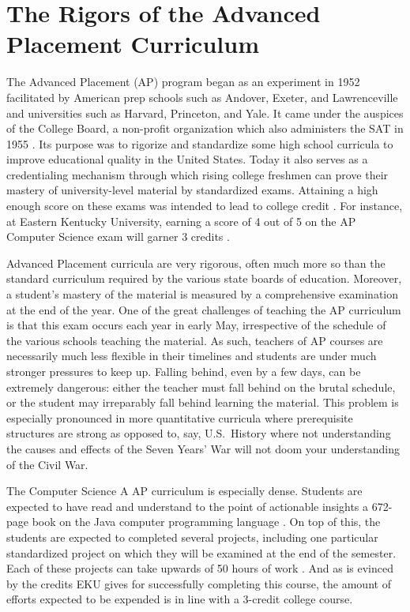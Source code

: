 
\section{The Rigors of the Advanced Placement Curriculum}\label{sec:ap}

The Advanced Placement (AP) program began as an experiment in 1952 facilitated
by American prep schools such as Andover, Exeter, and Lawrenceville and
universities such as Harvard, Princeton, and Yale. It came under the auspices of
the College Board, a non-profit organization which also administers the SAT
\autocite[``How is the SAT related to the College Board'']{SATFAQ} in 1955
\autocite{APHistory}.
Its purpose was to rigorize and standardize some high school curricula to
improve educational quality in the United States. Today it also serves as a
credentialing mechanism through which rising college freshmen can prove their
mastery of university-level material by standardized exams. Attaining a high
enough score on these exams was intended to lead to college credit
\autocite{APHistory}. For instance, at Eastern Kentucky University, earning a
score of 4 out of 5 on the AP Computer Science exam will garner 3 credits
\autocite{EKUAP}.

Advanced Placement curricula are very rigorous, often much more so than the
standard curriculum required by the various state boards of education. Moreover,
a student's mastery of the material is measured by a comprehensive examination
at the end of the year. One of the great challenges of teaching the AP
curriculum is that this exam occurs each year in early May, irrespective of the
schedule of the various schools teaching the material. As such, teachers of AP
courses are necessarily much less flexible in their timelines and students are
under much stronger pressures to keep up. Falling behind, even by a few days,
can be extremely dangerous: either the teacher must fall behind on the brutal
schedule, or the student may irreparably fall behind learning the material. This
problem is especially pronounced in more quantitative curricula where
prerequisite structures are strong as opposed to, say, U.S.~History where
not understanding the causes and effects of the Seven Years' War will not
doom your understanding of the Civil War.

The Computer Science A AP curriculum is especially dense. Students are expected
to have read and understand to the point of actionable insights a 672-page
book on the Java computer programming language \autocite{JavaBook}. On top of
this, the students are expected to completed several
projects, including one particular standardized project on which they will be
examined at the end of the semester. Each of these projects can take upwards of
50 hours of work \autocite{APCSACurriculum}. And as is evinced by the credits
EKU gives for successfully
completing this course, the amount of efforts expected to be expended is in
line with a 3-credit college course.

